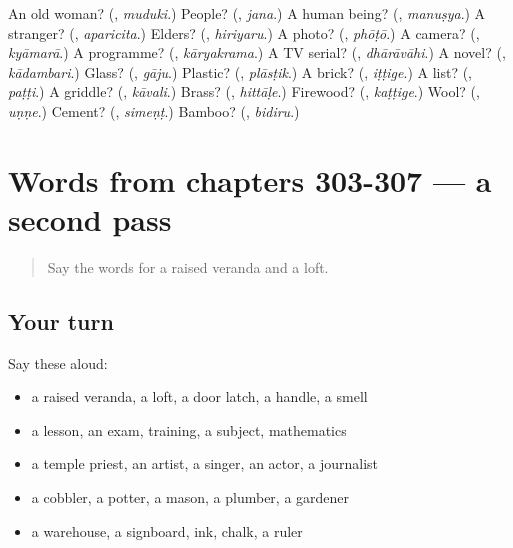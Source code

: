 \begin{tcolorbox}[breakable,colback=teal!4,colframe=teal!35!black,title={Before you move on}]
An old woman? (\textbf{}, \emph{muduki}.) People? (\textbf{}, \emph{jana}.) A human being? (\textbf{}, \emph{manuṣya}.) A stranger? (\textbf{}, \emph{aparicita}.) Elders? (\textbf{}, \emph{hiriyaru}.) A photo? (\textbf{}, \emph{phōṭō}.) A camera? (\textbf{}, \emph{kyāmarā}.) A programme? (\textbf{}, \emph{kāryakrama}.) A TV serial? (\textbf{}, \emph{dhārāvāhi}.) A novel? (\textbf{}, \emph{kādambari}.) Glass? (\textbf{}, \emph{gāju}.) Plastic? (\textbf{}, \emph{plāsṭik}.) A brick? (\textbf{}, \emph{iṭṭige}.) A list? (\textbf{}, \emph{paṭṭi}.) A griddle? (\textbf{}, \emph{kāvali}.) Brass? (\textbf{}, \emph{hittāḷe}.) Firewood? (\textbf{}, \emph{kaṭṭige}.) Wool? (\textbf{}, \emph{uṇṇe}.) Cement? (\textbf{}, \emph{simeṇṭ}.) Bamboo? (\textbf{}, \emph{bidiru}.)
\end{tcolorbox}
\section[(dialogue)]{Words from chapters 303-307 — a second pass}

\label{lesson:KA-R307-second-pass-words-from-chapters-303-307}



\begin{quote}
Say the words for a raised veranda and a loft.
\end{quote}

\subsection*{Your turn}
Say these aloud:

\begin{itemize}
\raggedright
  \item a raised veranda, a loft, a door latch, a handle, a smell
  \item a lesson, an exam, training, a subject, mathematics
  \item a temple priest, an artist, a singer, an actor, a journalist
  \item a cobbler, a potter, a mason, a plumber, a gardener
  \item a warehouse, a signboard, ink, chalk, a ruler
\end{itemize}

